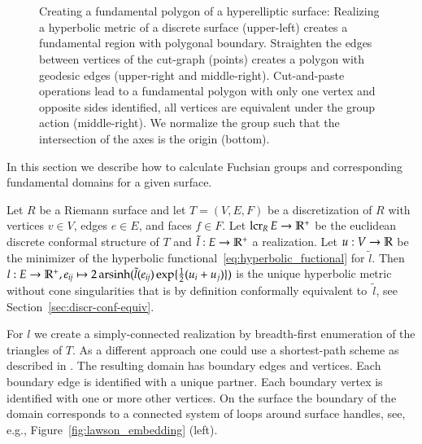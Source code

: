 \documentclass[Thesis.tex]{subfiles}
\begin{document}
  \begin{figure}
  \centering
  \\
  \\
  \caption{
  Creating a fundamental polygon of a hyperelliptic surface:
  Realizing a hyperbolic metric of a discrete surface (upper-left) creates a fundamental region with polygonal boundary.
  Straighten the edges between vertices of the cut-graph (points) creates a polygon with geodesic edges (upper-right and middle-right).
  Cut-and-paste operations lead to a fundamental polygon with only one vertex and opposite sides identified, all vertices are equivalent under the group action (middle-right).
  We normalize the group such that the intersection of the axes is the origin (bottom).
  }
  \label{fig:fundamental_polygon_algorithm}
  \end{figure}

  In this section we describe how to calculate Fuchsian groups and corresponding fundamental domains for a given surface.

  Let $R$ be a Riemann surface and let $T=(V, E, F)$ be a discretization of $R$ with vertices $v\in V$, edges $e\in E$, and faces $f\in F$. Let $\operatorname{lcr}_R E\to \mathbb R^+$ be the euclidean discrete conformal structure of $T$ and $\tilde l:E\to \mathbb R^+$ a realization. Let $u:V\to \mathbb R$ be the minimizer of the hyperbolic functional~\ref{eq:hyperbolic_fuctional} for $\tilde l$. Then $l:E \to \mathbb R^+, e_{\it ij}\mapsto 2\operatorname{arsinh}(\tilde l(e_{\it ij})\exp\{\frac{1}{2}(u_i+u_j)\})$ is the unique hyperbolic metric without cone singularities that is by definition conformally equivalent to~$\tilde l$, see Section~\ref{sec:discr-conf-equiv}.

  For $l$ we create a simply-connected realization by breadth-first enumeration of the triangles of $T$. As a different approach one could use a shortest-path scheme as described in \cite{EricksonH02}.  The resulting domain has boundary edges and vertices. Each boundary edge is identified with a unique partner. Each boundary vertex is identified with one or more other vertices. On the surface the boundary of the domain corresponds to a connected system of loops around surface handles, see, e.g., Figure~\ref{fig:lawson_embedding} (left).
\end{document}
